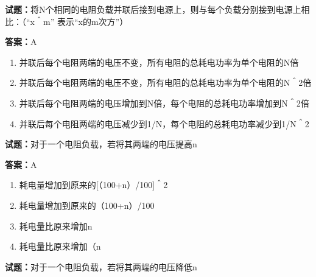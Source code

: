 \documentclass{ctexbook}
\begin{document}


\vspace{1em}

\textbf{试题：}将N个相同的电阻负载并联后接到电源上，则与每个负载分别接到电源上相比：（“x＾m”
表示“x的m次方”） 

\textbf{答案：}A 

\begin{enumerate}[leftmargin=3em]
  \item 并联后每个电阻两端的电压不变，所有电阻的总耗电功率为单个电阻的N倍 

  \item 并联后每个电阻两端的电压不变，所有电阻的总耗电功率为单个电阻的N＾2倍 

  \item 并联后每个电阻两端的电压增加到N倍，每个电阻的总耗电功率增加到N＾2倍 

  \item 并联后每个电阻两端的电压减少到1/N，每个电阻的总耗电功率减少到1/N＾2 

\end{enumerate}





\vspace{1em}

\textbf{试题：}对于一个电阻负载，若将其两端的电压提高n%

\textbf{答案：}A 

\begin{enumerate}[leftmargin=3em]
  \item 耗电量增加到原来的[（100+n）/100]＾2 

  \item 耗电量增加到原来的（100+n）/100 

  \item 耗电量比原来增加n%

  \item 耗电量比原来增加（n%

\end{enumerate}





\vspace{1em}

\textbf{试题：}对于一个电阻负载，若将其两端的电压降低n%
\end{document}
